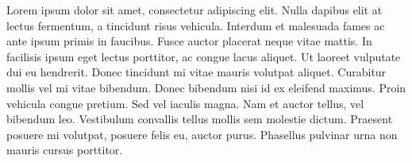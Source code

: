 
\begin{agradecimentos}[AGRADECIMENTOS]

Lorem ipsum dolor sit amet, consectetur adipiscing elit. Nulla dapibus elit at lectus fermentum, a tincidunt risus vehicula. Interdum et malesuada fames ac ante ipsum primis in faucibus. Fusce auctor placerat neque vitae mattis. In facilisis ipsum eget lectus porttitor, ac congue lacus aliquet. Ut laoreet vulputate dui eu hendrerit. Donec tincidunt mi vitae mauris volutpat aliquet. Curabitur mollis vel mi vitae bibendum. Donec bibendum nisi id ex eleifend maximus. Proin vehicula congue pretium. Sed vel iaculis magna. Nam et auctor tellus, vel bibendum leo. Vestibulum convallis tellus mollis sem molestie dictum. Praesent posuere mi volutpat, posuere felis eu, auctor purus. Phasellus pulvinar urna non mauris cursus porttitor.

\end{agradecimentos}
